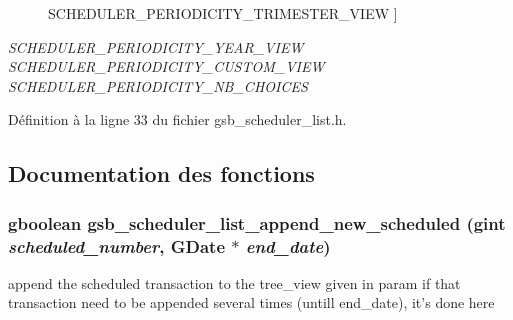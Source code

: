 \begin{Desc}
\begin{description}
{SCHEDULER\_\-PERIODICITY\_\-TRIMESTER\_\-VIEW\label{gsb__scheduler__list_8h_a12be35db3678d06856d2d0a9ed88c99fa56886f0330e75d47ab8ce48862553d0c}
}]\item[{\em 
SCHEDULER\_\-PERIODICITY\_\-YEAR\_\-VIEW\label{gsb__scheduler__list_8h_a12be35db3678d06856d2d0a9ed88c99fa827e62a34c30e5cd8bdf60b15bb96009}
}]\item[{\em 
SCHEDULER\_\-PERIODICITY\_\-CUSTOM\_\-VIEW\label{gsb__scheduler__list_8h_a12be35db3678d06856d2d0a9ed88c99faa61a2684a7f9891e9ab77e2e2c877ded}
}]\item[{\em 
SCHEDULER\_\-PERIODICITY\_\-NB\_\-CHOICES\label{gsb__scheduler__list_8h_a12be35db3678d06856d2d0a9ed88c99fac399afd88d18a2a804db420f3158006b}
}]\end{description}
\end{Desc}



Définition à la ligne 33 du fichier gsb\_\-scheduler\_\-list.h.



\subsection{Documentation des fonctions}
\subsubsection[{gsb\_\-scheduler\_\-list\_\-append\_\-new\_\-scheduled}]{\setlength{\rightskip}{0pt plus 5cm}gboolean gsb\_\-scheduler\_\-list\_\-append\_\-new\_\-scheduled (gint {\em scheduled\_\-number}, \/  GDate $\ast$ {\em end\_\-date})}\label{gsb__scheduler__list_8h_a44db4084e9e03a49fb9c73b5bff9e788}
append the scheduled transaction to the tree\_\-view given in param if that transaction need to be appended several times (untill end\_\-date), it's done here


